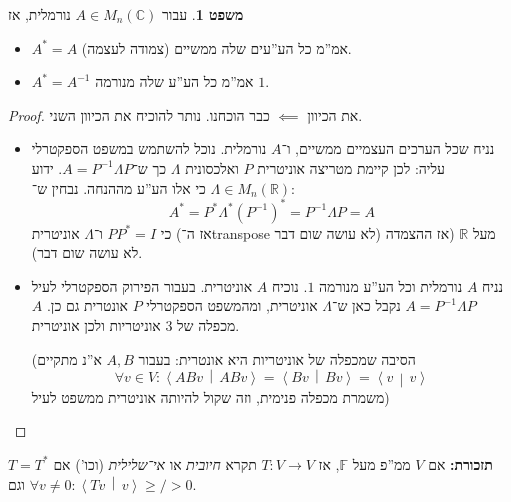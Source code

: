 \documentclass[a4paper]{article}
\newcommand\envendproof{\vspace{-16pt}}
\newcommand\R     {\mathbb{R}}
\newcommand\C     {\mathbb{C}}
\newcommand\ra    {\rangle}
\newcommand\la    {\langle}
\newcommand\F         {\mathbb{F}}
\newcommand\co        {\colon}
\newcommand\mut [2]   {\left \la #1 \,\middle|\, #2 \right \ra}
\newcommand\Lg        {\Lambda}
\newcommand\op    {^{-1}}
\theoremstyle{definition}
\newtheorem{Theorem}{\color{myblue}משפט}
\newcommand\theo  [1] {\begin{Theorem}#1\end{Theorem}}
\begin{document}
	\theo{עבור $A \in M_n(\C)$ נורמלית, אז
		\begin{itemize}
			\item $A^* = A$ (צמודה לעצמה) אמ''מ כל הע''עים שלה ממשיים. 
			\item $A^* = A\op$ אמ''מ כל הע''ע שלה מנורמה $1$. 
	\end{itemize}}
	\begin{proof}
		את הכיוון $\impliedby$ כבר הוכחנו. נותר להוכיח את הכיוון השני. 
		\begin{itemize}
			\item נניח שכל הערכים העצמיים ממשיים, ו־$A$ נורמלית. נוכל להשתמש במשפט הספקטרלי עליה: לכן קיימת מטריצה אוניטרית $P$ ואלכסונית $\Lg$ כך ש־$A = P\op \Lg P$. ידוע $\Lg \in M_n(\R)$ כי אלו הע''ע מההנחה. נבחין ש־: 
			\[ A^* = P^* \Lg^* (P\op)^* = P\op \Lg P = A \]
			כי $PP^* =I$ ו־$\Lg$ אוניטרית (אז ה־transpose לא עושה שום דבר) מעל $\R$ (אז ההצמדה לא עושה שום דבר). 
			\item נניח $A$ נורמלית וכל הע''ע מנורמה $1$. נוכיח $A$ אוניטרית. בעבור הפירוק הספקטרלי לעיל $A = P\op \Lg P$ נקבל כאן ש־$\Lg$ אוניטרית, ומהמשפט הספקטרלי $P$ אונטרית גם כן. $A$ מכפלה של 3 אוניטריות ולכן אוניטרית. 
			
			(הסיבה שמכפלה של אוניטריות היא אונטרית: בעבור $A, B$ א''נ מתקיים
			\[ \forall v \in V \co \mut{ABv}{ABv} = \mut{Bv}{Bv} = \mut{v}{v} \]
			משמרת מכפלה פנימית, וזה שקול להיותה אוניטרית ממשפט לעיל)
		\end{itemize}
		\envendproof
	\end{proof}
	
	\textbf{תזכורת: }אם $V$ ממ''פ מעל $\F$, אז $T \co V \to V$ תקרא \textit{חיובית} או \textit{אי־שלילית} (וכו') אם $T = T^*$ וגם $\forall v \neq 0 \co \mut{Tv}{v} \ge\!/\!> 0$. 
	
\end{document}

